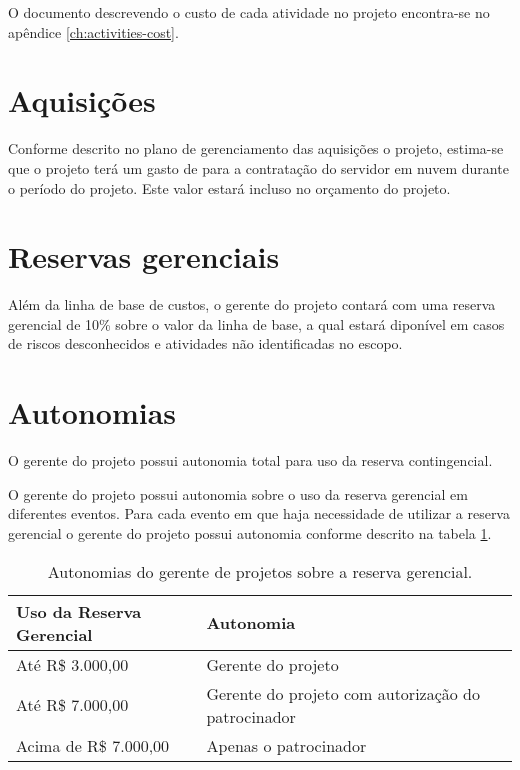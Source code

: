 O documento descrevendo o custo de cada atividade no projeto encontra-se no apêndice \ref{ch:activities-cost}.

\section{Aquisições}

Conforme descrito no plano de gerenciamento das aquisições o projeto, estima-se que o projeto terá um gasto de \procurementBudget{} para a contratação do servidor em nuvem durante o período do projeto. Este valor estará incluso no orçamento do projeto.

\section{Reservas gerenciais}

Além da linha de base de custos, o gerente do projeto contará com uma reserva gerencial de 10\% sobre o valor da linha de base, a qual estará diponível em casos de riscos desconhecidos e atividades não identificadas no escopo.

\section{Autonomias}

O gerente do projeto possui autonomia total para uso da reserva contingencial.

O gerente do projeto possui autonomia sobre o uso da reserva gerencial em diferentes eventos. Para cada evento em que haja necessidade de utilizar a reserva gerencial o gerente do projeto possui autonomia conforme descrito na tabela \ref{tab:project-manager-cost-autonomy}.

\begin{table}[h]
	\centering
	\begin{tabular}{| l | l |}
		\hline
		\textbf{Uso da Reserva Gerencial} & \textbf{Autonomia}                                   \\
		\hline
		Até R\$ 3.000,00                 & Gerente do projeto                                   \\
		\hline
		Até R\$ 7.000,00                 & Gerente do projeto com autorização do patrocinador \\
		\hline
		Acima de R\$ 7.000,00             & Apenas o patrocinador                                \\
		\hline
	\end{tabular}
	\caption{Autonomias do gerente de projetos sobre a reserva gerencial.}
	\label{tab:project-manager-cost-autonomy}
\end{table}


